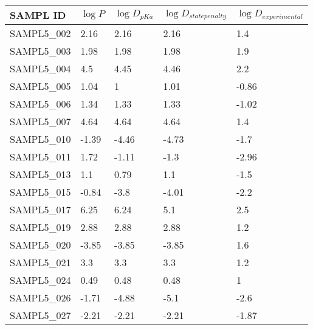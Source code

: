 \documentclass{article}
\begin{document}
\begin{table}[]
\centering
\begin{tabular}{|l|l|l|l|l|}
\hline
SAMPL ID    & $\log P$ & $\log D_{pKa}$ & $\log D_{state penalty}$ & $\log D_{experimental}$ \\ \hline
SAMPL5\_002 & 2.16     & 2.16           & 2.16                     & 1.4                     \\ \hline
SAMPL5\_003 & 1.98     & 1.98           & 1.98                     & 1.9                     \\ \hline
SAMPL5\_004 & 4.5      & 4.45           & 4.46                     & 2.2                     \\ \hline
SAMPL5\_005 & 1.04     & 1              & 1.01                     & -0.86                   \\ \hline
SAMPL5\_006 & 1.34     & 1.33           & 1.33                     & -1.02                   \\ \hline
SAMPL5\_007 & 4.64     & 4.64           & 4.64                     & 1.4                     \\ \hline
SAMPL5\_010 & -1.39    & -4.46          & -4.73                    & -1.7                    \\ \hline
SAMPL5\_011 & 1.72     & -1.11          & -1.3                     & -2.96                   \\ \hline
SAMPL5\_013 & 1.1      & 0.79           & 1.1                      & -1.5                    \\ \hline
SAMPL5\_015 & -0.84    & -3.8           & -4.01                    & -2.2                    \\ \hline
SAMPL5\_017 & 6.25     & 6.24           & 5.1                      & 2.5                     \\ \hline
SAMPL5\_019 & 2.88     & 2.88           & 2.88                     & 1.2                     \\ \hline
SAMPL5\_020 & -3.85    & -3.85          & -3.85                    & 1.6                     \\ \hline
SAMPL5\_021 & 3.3      & 3.3            & 3.3                      & 1.2                     \\ \hline
SAMPL5\_024 & 0.49     & 0.48           & 0.48                     & 1                       \\ \hline
SAMPL5\_026 & -1.71    & -4.88          & -5.1                     & -2.6                    \\ \hline
SAMPL5\_027 & -2.21    & -2.21          & -2.21                    & -1.87                   \\ \hline

\end{tabular}
\end{table}
\end{document}
